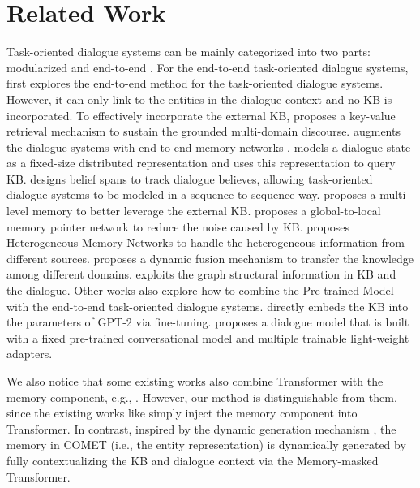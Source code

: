 \documentclass[11pt]{article}
\begin{document}
\section{Related Work}
\label{sec:related_work}

Task-oriented dialogue systems can be mainly categorized into two parts: modularized \cite{williams2007partially,wen-etal-2017-network} and  end-to-end \cite{eric-manning-2017-copy}. 
For the end-to-end task-oriented dialogue systems, \cite{eric-manning-2017-copy} first explores the end-to-end method for the task-oriented dialogue systems. However, it can only link to the entities in the dialogue context and no KB is incorporated. 
To effectively incorporate the external KB, \cite{eric-etal-2017-key} proposes a key-value retrieval mechanism to sustain the grounded multi-domain discourse. 
\cite{madotto-etal-2018-mem2seq} augments the dialogue systems with end-to-end memory networks \cite{sukhbaatar-2015-memory}. 
\cite{wen-etal-2018-sequence} models a dialogue state as a fixed-size distributed representation and uses this representation to query KB. 
\cite{lei-etal-2018-sequicity} designs belief spans to track dialogue believes, allowing task-oriented dialogue systems to be modeled in a sequence-to-sequence way. 
\cite{gangi-reddy-etal-2019-multi} proposes a multi-level memory to better leverage the external KB.
\cite{wu2018globaltolocal} proposes a global-to-local memory pointer network to reduce the noise caused by KB.
\cite{lin-etal-2019-task} proposes Heterogeneous Memory Networks to handle the heterogeneous information from different sources.
\cite{qin-etal-2020-dynamic} proposes a dynamic fusion mechanism to transfer the knowledge among different domains. 
\cite{yang-etal-2020-graphdialog} exploits the graph structural information in KB and the dialogue.
Other works also explore how to combine the Pre-trained Model \cite{devlin2018bert,radford2019language} with the end-to-end task-oriented dialogue systems. \cite{madotto2020learning} directly embeds the KB into the parameters of GPT-2 \cite{radford2019language} via fine-tuning. 
\cite{madotto2020adapter} proposes a dialogue model that is built with a fixed pre-trained conversational model and multiple trainable light-weight adapters. 

We also notice that some existing works also combine Transformer with the memory component, e.g., \cite{ma2021streaming}. 
However, our method is distinguishable from them, since the existing works like \cite{ma2021streaming} simply inject the memory component into Transformer.
In contrast, inspired by the dynamic generation mechanism \cite{GOU2020105912}, the memory in COMET (i.e., the entity representation) is dynamically generated by fully contextualizing the KB and dialogue context via the Memory-masked Transformer.
\end{document}
